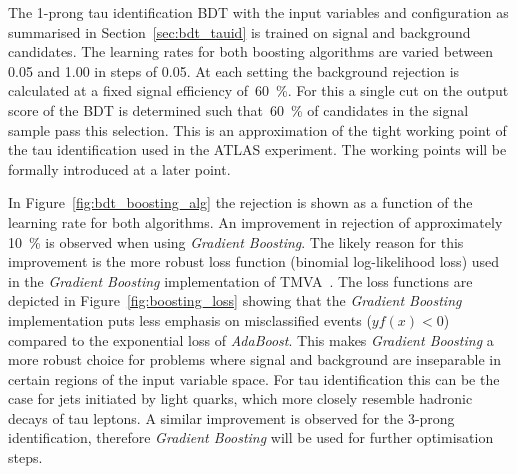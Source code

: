The 1-prong tau identification BDT with the input variables and configuration as
summarised in Section~\ref{sec:bdt_tauid} is trained on signal and background
\tauhadvis candidates. The learning rates for both boosting algorithms are
varied between 0.05 and 1.00 in steps of 0.05. At each setting the background
rejection is calculated at a fixed signal efficiency of~\SI{60}{\percent}. For
this a single cut on the output score of the BDT is determined such
that~\SI{60}{\percent} of \tauhadvis candidates in the signal sample pass this
selection. This is an approximation of the tight working point of the tau
identification used in the ATLAS experiment. The working points will be formally
introduced at a later point.

In Figure~\ref{fig:bdt_boosting_alg} the rejection is shown as a function of the
learning rate for both algorithms. An improvement in rejection of approximately
\SI{10}{\percent} is observed when using \emph{Gradient Boosting}. The likely
reason for this improvement is the more robust loss function (binomial
log-likelihood loss) used in the \emph{Gradient Boosting} implementation of
TMVA~\cite{tmva}. The loss functions are depicted in
Figure~\ref{fig:boosting_loss} showing that the \emph{Gradient Boosting}
implementation puts less emphasis on misclassified events ($y f(x) < 0$)
compared to the exponential loss of \emph{AdaBoost}. This makes \emph{Gradient
  Boosting} a more robust choice for problems where signal and background are
inseparable in certain regions of the input variable space. For tau
identification this can be the case for jets initiated by light quarks, which
more closely resemble hadronic decays of tau leptons. A similar improvement is
observed for the 3-prong identification, therefore \emph{Gradient Boosting} will
be used for further optimisation steps.

